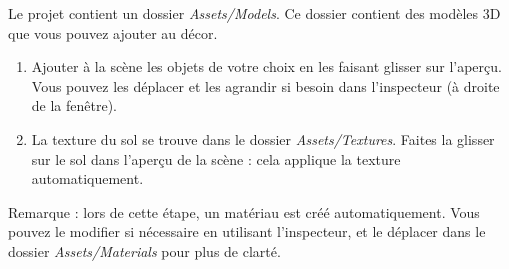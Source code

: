 Le projet contient un dossier \textit{Assets/Models}. Ce dossier contient des modèles 3D que vous pouvez ajouter au décor.
\begin{enumerate}
\item Ajouter à la scène les objets de votre choix en les faisant glisser sur l'aperçu. Vous pouvez les déplacer et les agrandir si besoin dans l'inspecteur (à droite de la fenêtre).
\item La texture du sol se trouve dans le dossier \textit{Assets/Textures}. Faites la glisser sur le sol dans l'aperçu de la scène : cela applique la texture automatiquement.
\end{enumerate}

Remarque : lors de cette étape, un matériau est créé automatiquement. Vous pouvez le modifier si nécessaire en utilisant l'inspecteur, et le déplacer dans le dossier \textit{Assets/Materials} pour plus de clarté.